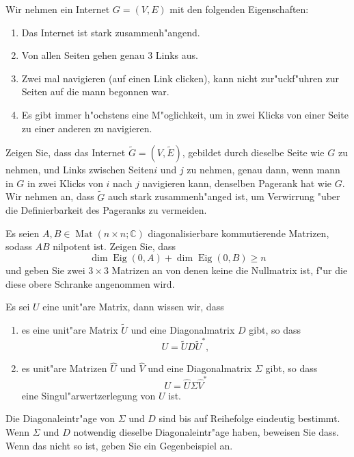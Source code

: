 \documentclass[a4paper]{article}
\begin{document}
\begin{klaufg}{8}{}
Wir nehmen ein Internet $G = (V, E)$ mit den folgenden Eigenschaften:
\begin{enumerate}
\item
Das Internet ist stark zusammenh"angend.
\item
Von allen Seiten gehen genau $3$ Links aus.
\item
Zwei mal navigieren (auf einen Link clicken), kann nicht zur"uckf"uhren zur Seiten auf die mann begonnen war.
\item
Es gibt immer h"ochstens eine M"oglichkeit, um in zwei Klicks von einer Seite zu einer anderen zu navigieren.
\end{enumerate}
Zeigen Sie, dass das Internet $\tilde{G} = (V, \tilde{E})$, gebildet durch dieselbe Seite wie $G$ zu nehmen, und Links zwischen Seiten$i$ und $j$ zu nehmen, genau dann, wenn mann in $G$ in zwei Klicks von $i$ nach $j$ navigieren kann, denselben Pagerank hat wie $G$. Wir nehmen an, dass $\tilde{G}$ auch stark zusammenh"anged ist, um Verwirrung "uber die Definierbarkeit des Pageranks zu vermeiden.
\end{klaufg}

\begin{klaufg}{8}{}
Es seien $A, B \in \operatorname{Mat}(n \times n ; \mathbb{C})$ diagonalisierbare kommutierende Matrizen, sodass $AB$ nilpotent ist. Zeigen Sie, dass
\[
\dim \operatorname{Eig}(0, A) + \dim \operatorname{Eig}(0, B) \geq n
\]
und geben Sie zwei $3 \times 3$ Matrizen an von denen keine die Nullmatrix ist, f"ur die diese obere Schranke angenommen wird.
\end{klaufg}

\begin{klaufg}{8}{}

Es sei $U$ eine unit"are Matrix, dann wissen wir, dass
\begin{enumerate}
\item
es eine unit"are Matrix $\tilde{U}$ und eine Diagonalmatrix $D$ gibt, so dass
\[
U = \tilde{U} D \tilde{U}^*,
\]
\item
es unit"are Matrizen $\widehat{U}$ und $\widehat{V}$ und eine Diagonalmatrix $\Sigma$ gibt, so dass
\[
U = \widehat{U} \Sigma \widehat{V}^*
\]
eine Singul"arwertzerlegung von $U$ ist.
\end{enumerate}
Die Diagonaleintr"age von $\Sigma$ und $D$ sind bis auf Reihefolge eindeutig bestimmt. Wenn $\Sigma$ und $D$ notwendig dieselbe Diagonaleintr"age haben, beweisen Sie dass. Wenn das nicht so ist, geben Sie ein Gegenbeispiel an.
\end{klaufg}
\end{document}
